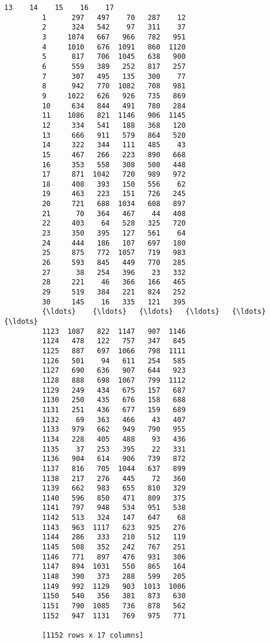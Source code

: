\documentclass[11pt]{article}
\begin{document}
\begin{Verbatim}[commandchars=\\\{\}]
                 13    14    15    16    17  
         1      297   497    70   287    12  
         2      324   542    97   311    37  
         3     1074   667   966   782   951  
         4     1010   676  1091   860  1120  
         5      817   706  1045   638   900  
         6      559   389   252   817   257  
         7      307   495   135   300    77  
         8      942   770  1082   708   981  
         9     1022   626   926   735   869  
         10     634   844   491   780   284  
         11    1086   821  1146   906  1145  
         12     334   541   188   368   120  
         13     666   911   579   864   520  
         14     322   344   111   485    43  
         15     467   266   223   890   668  
         16     353   558   308   500   448  
         17     871  1042   720   989   972  
         18     408   393   150   556    62  
         19     463   223   151   726   245  
         20     721   688  1034   608   897  
         21      70   364   467    44   408  
         22     403    64   528   325   720  
         23     350   395   127   561    64  
         24     444   186   107   697   180  
         25     875   772  1057   719   983  
         26     593   845   449   770   285  
         27      38   254   396    23   332  
         28     221    46   366   166   465  
         29     519   384   221   824   252  
         30     145    16   335   121   395  
         {\ldots}    {\ldots}   {\ldots}   {\ldots}   {\ldots}   {\ldots}  
         1123  1087   822  1147   907  1146  
         1124   478   122   757   347   845  
         1125   887   697  1066   798  1111  
         1126   501    94   611   254   585  
         1127   690   636   907   644   923  
         1128   888   698  1067   799  1112  
         1129   249   434   675   157   687  
         1130   250   435   676   158   688  
         1131   251   436   677   159   689  
         1132    69   363   466    43   407  
         1133   979   662   949   790   955  
         1134   228   405   488    93   436  
         1135    37   253   395    22   331  
         1136   904   614   906   739   872  
         1137   816   705  1044   637   899  
         1138   217   276   445    72   360  
         1139   662   983   655   810   329  
         1140   596   850   471   809   375  
         1141   797   948   534   951   538  
         1142   513   324   147   647    68  
         1143   963  1117   623   925   276  
         1144   286   333   210   512   119  
         1145   508   352   242   767   251  
         1146   771   897   476   931   306  
         1147   894  1031   550   865   164  
         1148   390   373   288   599   205  
         1149   992  1129   903  1013  1006  
         1150   540   356   381   873   630  
         1151   790  1085   736   878   562  
         1152   947  1131   769   975   771  
         
         [1152 rows x 17 columns]
\end{Verbatim}
            
\end{document}

